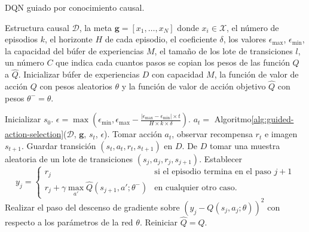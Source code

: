 \begin{mialgoritmo}[H]
  	\caption{DQN guiado por conocimiento causal.}
	\label{alg:dqn-algo-causal}
  \begin{algorithmic}[1]
  \REQUIRE Estructura causal $\mathcal{D}$, la meta $\mathbf{g} = [x_1, \dots, x_N]$ donde $x_i \in \mathcal{X}$, el número de episodios $k$, el horizonte $H$ de cada episodio, el coeficiente $\delta$, los valores $\epsilon_{\max}$, $\epsilon_{\min}$, la capacidad
  del búfer de experiencias $M$, el tamaño de los lote de transiciones $l$,  un número $C$ que indica cada cuantos pasos se copian los pesos de las función $Q$ a $\hat{Q}$.
  \STATE Inicializar búfer de experiencias $D$ con capacidad $M$, la función de valor de acción $Q$ con pesos aleatorios $\theta$ y la función de valor de acción objetivo $\hat{Q}$ con pesos $\theta^- = \theta$.
  
    \STATE Inicializar $s_0$.
    \STATE $\epsilon = \max(\epsilon_{\min}, \epsilon_{\max} - \frac{|\epsilon_{\max} - \epsilon_{\min}| \times t}{H \times k \times \delta})$.
    \STATE $a_t =$ Algoritmo\ref{alg:guided-action-selection}($\mathcal{D}$, $\mathbf{g}$, $s_t$, $\epsilon$).
    \STATE Tomar acción $a_t$, observar recompensa $r_{t}$ e imagen $s_{t+1}$.
    \STATE Guardar transición $(s_t, a_t, r_t, s_{t+1})$ en $D$.
    \STATE De $D$ tomar una muestra aleatoria de un lote de transiciones $(s_j, a_j, r_j, s_{j+1})$. 
    \STATE Establecer
	\[
	 y_j = 
   \begin{cases} 
      r_j  & \mbox{si el episodio termina en el paso } j + 1 \\
      r_j + \gamma \max_{a'}\hat{Q}(s_{j+1}, a'; \theta^-) & \mbox{en cualquier otro caso.}
   \end{cases}
	\]
	\STATE Realizar el paso del
	descenso de gradiente sobre $(y_j -  Q(s_j,a_j;\theta))^2$ con respecto a los parámetros de la red $\theta$.
	\STATE Reiniciar $\hat{Q} = Q$.
	\ENDIF
	\ENDFOR
  \ENDFOR
  \end{algorithmic}
\end{mialgoritmo}



